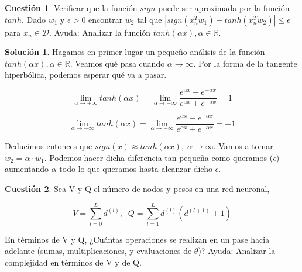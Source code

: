\documentclass[a4paper, 11pt]{article}
\theoremstyle{definition}
\newtheorem{cuestion}{Cuestión}
\newtheorem*{solucion}{Solución}
\begin{document}
  \begin{cuestion}
    Verificar que la función $sign$ puede ser aproximada por la función $tanh$. Dado $w_1$ y $\epsilon > 0$ encontrar $w_2$ tal que $|sign(x_n^Tw_1) - tanh(x_n^Tw_2)| \leq \epsilon$ para $x_n \in \mathcal{D}$. Ayuda: Analizar la función $tanh(\alpha x), \alpha \in \mathbb{R}$.
  \end{cuestion}

  \begin{solucion}
    Hagamos en primer lugar un pequeño análisis de la función $tanh(\alpha x), \alpha \in \mathbb{R}$. Veamos qué pasa cuando $\alpha \rightarrow \infty$. Por la forma de la tangente hiperbólica, podemos esperar qué va a pasar.

    \[
      \lim_{\alpha \rightarrow + \infty} tanh(\alpha x) = \lim_{\alpha \rightarrow + \infty} \frac{e^{\alpha x} - e^{-\alpha x}}{e^{\alpha x} + e^{-\alpha x}} = 1
    \]

    \[
      \lim_{\alpha \rightarrow - \infty} tanh(\alpha x) = \lim_{\alpha \rightarrow - \infty} \frac{e^{\alpha x} - e^{-\alpha x}}{e^{\alpha x} + e^{-\alpha x}} = -1
    \]

    Deducimos entonces que $sign(x) \approx tanh(\alpha x), \; \alpha \rightarrow \infty$. Vamos a tomar $w_2 = \alpha \cdot w_1$. Podemos hacer dicha diferencia tan pequeña como queramos ($\epsilon$) aumentando $\alpha$ todo lo que queramos hasta alcanzar dicho $\epsilon$.
  \end{solucion}

  \begin{cuestion}
    Sea V y Q el número de nodos y pesos en una red neuronal,

    $$ V = \sum_{l=0}^L d^{(l)}, \; \; Q = \sum_{l=1}^L d^{(l)} \left( d^{(l+1)} + 1\right) $$

    En términos de V y Q, ¿Cuántas operaciones se realizan en un pase hacia adelante (sumas, multiplicaciones, y evaluaciones de $\theta$)? Ayuda: Analizar la complejidad en términos de V y de Q.

  \end{cuestion}
\end{document}
